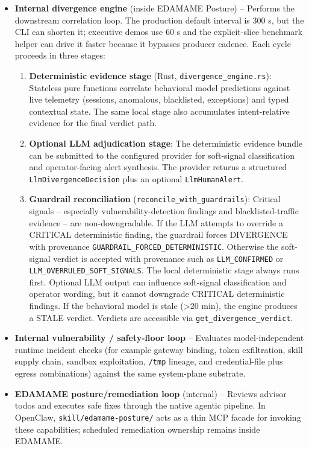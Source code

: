 \documentclass[
]{article}
\providecommand{\tightlist}{%
  \setlength{\itemsep}{0pt}\setlength{\parskip}{0pt}}
\begin{document}
\begin{itemize}
\tightlist
\item
  \textbf{Internal divergence engine} (inside EDAMAME Posture) --
  Performs the downstream correlation loop. The production default
  interval is 300 s, but the CLI can shorten it; executive demos use 60
  s and the explicit-slice benchmark helper can drive it faster because
  it bypasses producer cadence. Each cycle proceeds in three stages:

  \begin{enumerate}
  \def\labelenumi{\arabic{enumi}.}
  \tightlist
  \item
    \textbf{Deterministic evidence stage} (Rust,
    \texttt{divergence\_engine.rs}): Stateless pure functions correlate
    behavioral model predictions against live telemetry (sessions,
    anomalous, blacklisted, exceptions) and typed contextual state. The
    same local stage also accumulates intent-relative evidence for the
    final verdict path.
  \item
    \textbf{Optional LLM adjudication stage}: The deterministic evidence
    bundle can be submitted to the configured provider for soft-signal
    classification and operator-facing alert synthesis. The provider
    returns a structured \texttt{LlmDivergenceDecision} plus an optional
    \texttt{LlmHumanAlert}.
  \item
    \textbf{Guardrail reconciliation}
    (\texttt{reconcile\_with\_guardrails}): Critical signals --
    especially vulnerability-detection findings and blacklisted-traffic
    evidence -- are non-downgradable. If the LLM attempts to override a
    CRITICAL deterministic finding, the guardrail forces DIVERGENCE with
    provenance \texttt{GUARDRAIL\_FORCED\_DETERMINISTIC}. Otherwise the
    soft-signal verdict is accepted with provenance such as
    \texttt{LLM\_CONFIRMED} or \texttt{LLM\_OVERRULED\_SOFT\_SIGNALS}.
    The local deterministic stage always runs first. Optional LLM output
    can influence soft-signal classification and operator wording, but
    it cannot downgrade CRITICAL deterministic findings. If the
    behavioral model is stale (\textgreater20 min), the engine produces
    a STALE verdict. Verdicts are accessible via
    \texttt{get\_divergence\_verdict}.
  \end{enumerate}
\item
  \textbf{Internal vulnerability / safety-floor loop} -- Evaluates
  model-independent runtime incident checks (for example gateway
  binding, token exfiltration, skill supply chain, sandbox exploitation,
  \texttt{/tmp} lineage, and credential-file plus egress combinations)
  against the same system-plane substrate.
\item
  \textbf{EDAMAME posture/remediation loop} (internal) -- Reviews
  advisor todos and executes safe fixes through the native agentic
  pipeline. In OpenClaw, \texttt{skill/edamame-posture/} acts as a thin
  MCP facade for invoking these capabilities; scheduled remediation
  ownership remains inside EDAMAME.
\end{itemize}
\end{document}
